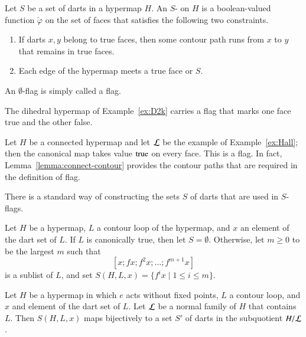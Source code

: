 \begin{definition}[flag]\label{def:flag} 
  Let $S$ be a set of darts in a hypermap $H$.  An $S$-
  on $H$ is a boolean-valued function $\check\varphi$ on the set of faces that
  satisfies the following two constraints.
\begin{enumerate}
\item If darts $x,y$ belong to true faces,
then  some contour path runs from $x$ to $y$ that remains
in true faces.
\item Each edge of the hypermap meets a true face or $S$.
\end{enumerate}
An $\emptyset$-flag is simply called a flag.
%
%
\end{definition}



\begin{example} \label{ex:DH}
The dihedral hypermap of Example~\ref{ex:D2k} carries a
flag that marks one face true and the other false.
\end{example}

\begin{example}\label{ex:Hall-flag} 
Let $H$ be a connected hypermap and let $\cal L$ be the example of
Example~\ref{ex:Hall}; then the canonical map takes value
${\operatorname{true}}$ on every face.  This is a flag. In fact,
Lemma~\ref{lemma:connect-contour} provides the contour paths that
are required in the definition of flag.
\end{example}



There is a standard way of constructing the sets $S$ of darts that
 are used in $S$-flags.  


\begin{definition}[S]
Let $H$ be a hypermap, $L$ a contour loop of the hypermap,
and $x$ an element of the dart set of $L$.
If  $L$ is  canonically true, then let $S=\emptyset$.
Otherwise,
let $m\ge0$ to be the largest $m$ 
such that 
\[ 
[x;f x; f^2 x;\ldots;f^{m+1} x]
\]   
is a sublist of $L$, and
set $S(H,L,x) = \{f^i x \mid 1 \le i\le m\}$.
\end{definition}

\begin{lemma}\label{lemma:flag-set-subquotient}
Let $H$ be a hypermap in which $e$ acts without fixed points, 
$L$ a contour loop, and $x$ and element of the dart set of $L$.
Let ${\cal L}$ be a normal family of $H$ that contains $L$.
Then $S(H,L,x)$ maps bijectively to a set $S'$ of darts in the subquotient $H/{\cal L}$.
\end{lemma}

